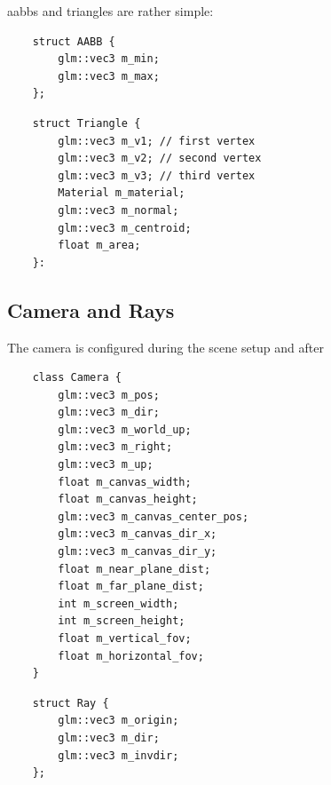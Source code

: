 \documentclass[
  twoside,
  11pt, a4paper,
  footinclude=true,
  headinclude=true,
  cleardoublepage=empty
]{scrreprt}
\begin{document}
\vspace{1cm}

\acp{aabb} and triangles are rather simple:

\begin{verbatim}
    struct AABB {
        glm::vec3 m_min;
        glm::vec3 m_max;
    };
\end{verbatim}

\begin{verbatim}
    struct Triangle {
        glm::vec3 m_v1; // first vertex
        glm::vec3 m_v2; // second vertex
        glm::vec3 m_v3; // third vertex
        Material m_material;
        glm::vec3 m_normal;
        glm::vec3 m_centroid;
        float m_area;
    }:
\end{verbatim}

\subsection{Camera and Rays}

The camera is configured during the scene setup and after %

\begin{verbatim}
    class Camera {
        glm::vec3 m_pos;
        glm::vec3 m_dir;
        glm::vec3 m_world_up;
        glm::vec3 m_right;
        glm::vec3 m_up;
        float m_canvas_width;
        float m_canvas_height;
        glm::vec3 m_canvas_center_pos;
        glm::vec3 m_canvas_dir_x;
        glm::vec3 m_canvas_dir_y;
        float m_near_plane_dist;
        float m_far_plane_dist;
        int m_screen_width;
        int m_screen_height;
        float m_vertical_fov;
        float m_horizontal_fov;
    }
\end{verbatim}

\begin{verbatim}
    struct Ray {
        glm::vec3 m_origin;
        glm::vec3 m_dir;
        glm::vec3 m_invdir;
    };
\end{verbatim}
\end{document}
